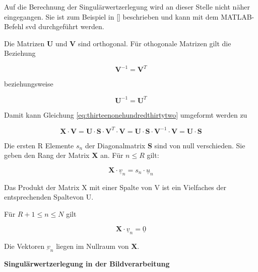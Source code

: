 \noindent Auf die Berechnung der Singul\"{a}rwertzerlegung wird an dieser Stelle nicht n\"{a}her eingegangen. Sie ist zum Beispiel in [] beschrieben und kann mit dem MATLAB-Befehl svd durchgef\"{u}hrt werden.\newline

\noindent Die Matrizen \textbf{U} und \textbf{V} sind orthogonal. F\"{u}r othogonale Matrizen gilt die Beziehung

\begin{equation}\label{eq:thirteenonehundredthirtyfour}
\mathbf{V}^{-1} =\mathbf{V}^{T}
\end{equation}

\noindent beziehungsweise 

\begin{equation}\label{eq:thirteenonehundredthirtyfive}
\mathbf{U}^{-1} =\mathbf{U}^{T}
\end{equation}

\noindent Damit kann Gleichung \eqref{eq:thirteenonehundredthirtytwo} umgeformt werden zu

\begin{equation}\label{eq:thirteenonehundredthirtysix}
\mathbf{X}\cdot \mathbf{V}=\mathbf{U}\cdot \mathbf{S}\cdot \mathbf{V}^{T} \cdot \mathbf{V}=\mathbf{U}\cdot \mathbf{S}\cdot \mathbf{V}^{-1} \cdot \mathbf{V}=\mathbf{U}\cdot \mathbf{S}
\end{equation}

\noindent Die ersten R Elemente $s_{n}$ der Diagonalmatrix \textbf{S} sind von null verschieden. Sie geben den Rang der Matrix \textbf{X} an. F\"{u}r $n \le R$  gilt:

\begin{equation}\label{eq:thirteenonehundredthirtyseven}
\mathbf{X}\cdot \underline{v}_{n} =s_{n} \cdot \underline{u}_{n}
\end{equation}

\noindent Das Produkt der Matrix X mit einer Spalte von V ist ein Vielfaches der entsprechenden Spaltevon U. 

\noindent F\"{u}r $R + 1 \le n \le N$ gilt

\begin{equation}\label{eq:thirteenonehundredthirtyeight}
\mathbf{X}\cdot \underline{v}_{n} =\underline{0}
\end{equation}

\noindent Die Vektoren $\underbar{v}_{n}$ liegen im Nullraum von \textbf{X}.\bigskip

\selectfont
\noindent\textbf{Singul\"{a}rwertzerlegung in der Bildverarbeitung} \smallskip 

